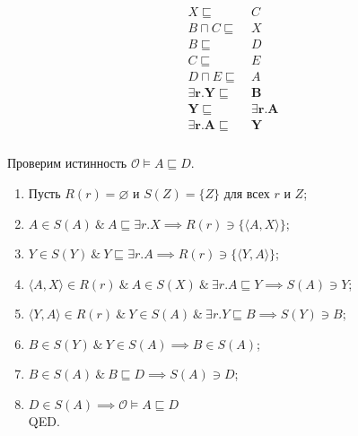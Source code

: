 \documentclass[11pt]{article}
\theoremstyle{definition}
\theoremstyle{lemma}
\theoremstyle{statement}
\begin{document}
\begin{multline*}
\begin{aligned}
            X \sqsubseteq&~C \\
            B \sqcap C \sqsubseteq&~X \\
            B \sqsubseteq&~D \\
            C \sqsubseteq&~E \\
            D \sqcap E \sqsubseteq&~A \\
            \mathbf{\exists r.Y} \sqsubseteq&~\mathbf{B} \\
            \mathbf{Y} \sqsubseteq&~\mathbf{\exists r.A} \\
            \mathbf{\exists r.A} \sqsubseteq&~\mathbf{Y} \\
        \end{aligned}
    \end{multline*}

    Проверим истинность $\mathcal{O} \models A \sqsubseteq D$.
    \begin{enumerate}
        \item Пусть $R(r) = \varnothing$ и $S(Z) = \{Z\}$ для всех $r$ и $Z$;
        \item $A \in S(A) ~\&~ A \sqsubseteq \exists r.X \implies R(r) \ni \{\langle A, X \rangle\}$;
        \item $Y \in S(Y) ~\&~ Y \sqsubseteq \exists r.A \implies R(r) \ni \{\langle Y, A \rangle\}$;
        \item $\langle A, X \rangle \in R(r) ~\&~ A \in S(X) ~\&~ \exists r.A \sqsubseteq Y \implies S(A) \ni Y$;
        \item $\langle Y, A \rangle \in R(r) ~\&~ Y \in S(A) ~\&~ \exists r.Y \sqsubseteq B \implies S(Y) \ni B$;
        \item $B \in S(Y) ~\&~ Y \in S(A) \implies B \in S(A) $;
        \item $B \in S(A) ~\&~ B \sqsubseteq D \implies S(A) \ni D$;
        \item $D \in S(A) \implies \mathcal{O} \models A \sqsubseteq D$ \\QED.
    \end{enumerate}
\end{document}
